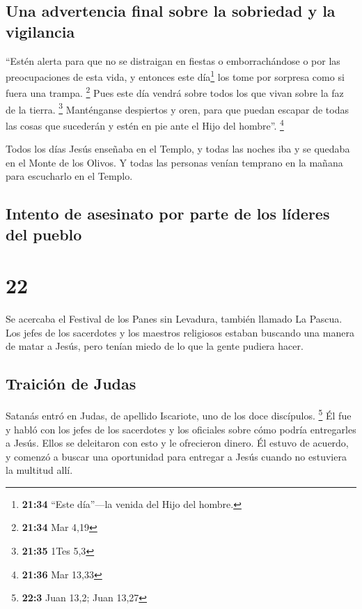 \hypertarget{una-advertencia-final-sobre-la-sobriedad-y-la-vigilancia}{%
\subsection{Una advertencia final sobre la sobriedad y la
vigilancia}\label{una-advertencia-final-sobre-la-sobriedad-y-la-vigilancia}}

 ``Estén alerta para que no se distraigan en fiestas o
emborrachándose o por las preocupaciones de esta vida, y entonces este
día\footnote{\textbf{21:34} ``Este día''---la venida del Hijo del
  hombre.} los tome por sorpresa como si fuera una trampa. \footnote{\textbf{21:34}
  Mar 4,19}  Pues este día vendrá sobre todos los que
vivan sobre la faz de la tierra. \footnote{\textbf{21:35} 1Tes 5,3}
 Manténganse despiertos y oren, para que puedan escapar
de todas las cosas que sucederán y estén en pie ante el Hijo del
hombre''. \footnote{\textbf{21:36} Mar 13,33}

 Todos los días Jesús enseñaba en el Templo, y todas las
noches iba y se quedaba en el Monte de los Olivos.  Y
todas las personas venían temprano en la mañana para escucharlo en el
Templo.

\hypertarget{intento-de-asesinato-por-parte-de-los-luxedderes-del-pueblo}{%
\subsection{Intento de asesinato por parte de los líderes del
pueblo}\label{intento-de-asesinato-por-parte-de-los-luxedderes-del-pueblo}}

\hypertarget{section-21}{%
\section{22}\label{section-21}}

 Se acercaba el Festival de los Panes sin Levadura,
también llamado La Pascua.  Los jefes de los sacerdotes y
los maestros religiosos estaban buscando una manera de matar a Jesús,
pero tenían miedo de lo que la gente pudiera hacer.

\hypertarget{traiciuxf3n-de-judas}{%
\subsection{Traición de Judas}\label{traiciuxf3n-de-judas}}

 Satanás entró en Judas, de apellido Iscariote, uno de los
doce discípulos. \footnote{\textbf{22:3} Juan 13,2; Juan 13,27}
 Él fue y habló con los jefes de los sacerdotes y los
oficiales sobre cómo podría entregarles a Jesús.  Ellos se
deleitaron con esto y le ofrecieron dinero.  Él estuvo de
acuerdo, y comenzó a buscar una oportunidad para entregar a Jesús cuando
no estuviera la multitud allí.


